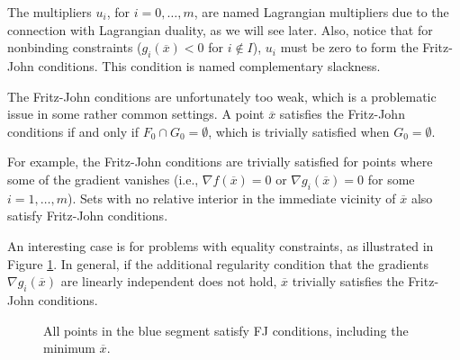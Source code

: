 The multipliers $u_i$, for $i=0,\dots,m$, are named Lagrangian multipliers due to the connection with Lagrangian duality, as we will see later. Also, notice that for nonbinding constraints ($g_i(\overline{x})<0$ for $i \notin I$), $u_i$ must be zero to form the Fritz-John conditions. This condition is named complementary slackness. 


The Fritz-John conditions are unfortunately too weak, which is a problematic issue in some rather common settings. A point $\overline{x}$ satisfies the Fritz-John conditions if and only if $F_0 \cap G_0 = \emptyset$, which is trivially satisfied when $G_0 = \emptyset$.

For example, the Fritz-John conditions are trivially satisfied for points where some of the gradient vanishes (i.e., $\nabla f (\overline{x})=0$ or $\nabla g_i(\overline{x})=0$ for some $i=1,\dots,m$). Sets with no relative interior in the immediate vicinity of $\overline{x}$ also satisfy Fritz-John conditions. 

An interesting case is for problems with equality constraints, as illustrated in Figure \ref{FJ-linear}. In general, if the additional regularity condition that the gradients $\nabla g_i(\overline{x})$ are linearly independent does not hold, $\overline{x}$ trivially satisfies the Fritz-John conditions.

\begin{figure}[h]
	\caption{All points in the blue segment satisfy FJ conditions, including the minimum $\overline{x}$.} \label{FJ-linear}
\end{figure}

